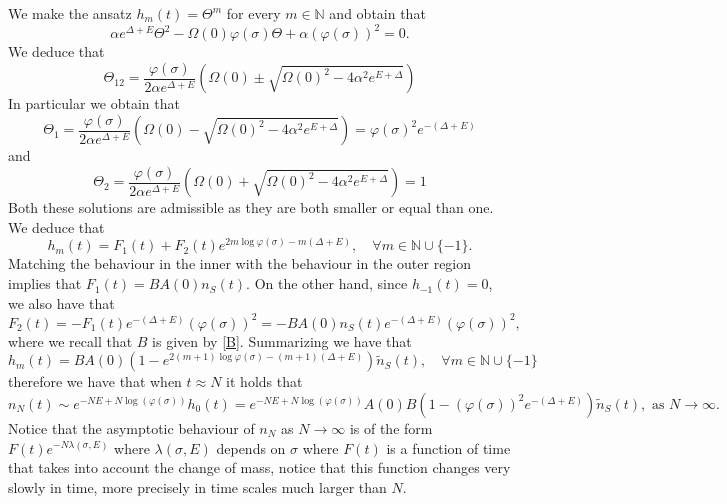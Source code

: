 \documentclass{article}
\numberwithin{equation}{section}
\theoremstyle{plain}
\begin{document}
       We make the ansatz $h_m(t) = \Theta^m $ for every $m \in \mathbb N  $ and obtain that 
       \[
       \alpha e^{\Delta+ E  }  \Theta^2 - \Omega(0) \varphi(\sigma)    \Theta  + \alpha  (\varphi(\sigma))^2 =0.   
       \]
       We deduce that 
       \[
       \Theta_{12} = \frac{\varphi(\sigma)}{2\alpha e^{\Delta+ E  }} \left( \Omega(0) \pm \sqrt{\Omega (0)^2 - 4 \alpha^2 e^{E+\Delta}} \right) 
       \]
       In particular we obtain that 
       \[
       \Theta_1 =  \frac{\varphi(\sigma)}{2\alpha e^{\Delta+ E  }} \left( \Omega(0) - \sqrt{\Omega (0)^2 - 4 \alpha^2 e^{E+\Delta}} \right) = \varphi(\sigma)^2 e^{- (\Delta+ E ) } 
       \]
       and 
            \[
       \Theta_2 =  \frac{\varphi(\sigma)}{2\alpha e^{\Delta+ E  }} \left( \Omega(0) + \sqrt{\Omega (0)^2 - 4 \alpha^2 e^{E+\Delta}} \right) = 1
       \]
       Both these solutions are admissible as they are both smaller or equal than one. 
We deduce that 
\[
h_m(t) = F_1(t) + F_2(t) e^{ 2m \log \varphi(\sigma) - m (\Delta + E ) }, \quad \forall m  \in \mathbb N  \cup \{ -1 \}. 
\]
Matching the behaviour in the inner with the behaviour in the outer region implies that $F_1 (t)= B A(0) n_S(t) $. 
On the other hand, since $h_{-1} (t)=0$, we also have that 
\[ 
F_2(t) = - F_1  (t) e^{ -(\Delta + E)} (\varphi(\sigma))^2= - B  A(0) n_S(t)e^{- ( \Delta + E )}(\varphi(\sigma))^2, 
\] 
where we recall that $B$ is given by \eqref{B}. 
Summarizing we have that 
\[
h_m(t) = B A(0) \left( 1 - e^{ 2(m+1) \log \varphi(\sigma) - (m+1) (\Delta + E ) } \right) \tilde{n}_S (t), \quad \forall m  \in \mathbb N  \cup \{ -1 \}
\]
therefore  we have that when $t \approx N $ it holds that 
\begin{equation}\label{asymptotics of n_N super}
n_{N}(t) \sim e^{- NE + N \log (\varphi(\sigma)) } h_0 (t)= e^{- N E + N \log (\varphi(\sigma)) } A(0) B \left( 1 - ( \varphi(\sigma))^2 e^{  -  (\Delta + E ) } \right)  \tilde{n}_S (t), \text{ as } N \to \infty.
\end{equation}
Notice that the asymptotic behaviour of $n_N $ as $N \to \infty $ is of the form $ F(t) e^{- N \lambda (\sigma, E)} $ where $\lambda (\sigma,E)$ depends on $\sigma$ where $F(t) $ is a function of time that takes into account the change of mass, notice that this function changes very slowly in time, more precisely in time scales much larger than $N$. 
\end{document}

